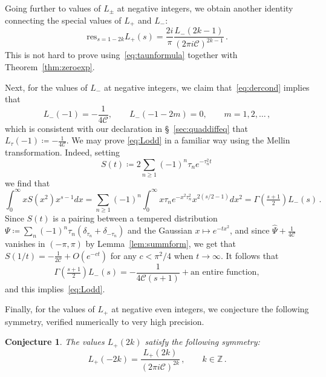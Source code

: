 \documentclass[12pt]{amsart}
\theoremstyle{plain}
\newtheorem{conjecture}{Conjecture}
\numberwithin{equation}{section}
\theoremstyle{definition}
\newcommand{\Z}{\mathbb{Z}}
\newcommand{\Cone}{\mathscr{C}}
\begin{document}
Going further to values of $L_{\pm}$ at negative integers, we obtain another identity connecting the special values of $L_{+}$ and $L_{-}$:
	\[\mathrm{res}_{s=1-2k}   L_{+}(s) = \frac{2i}{\pi}\frac{L_{-}(2k-1)}{(2\pi i \Cone)^{2k-1}}\,.\]
This is not hard to prove using~\eqref{eq:taunformula} together with Theorem~\ref{thm:zeroexp}.

Next, for the values of $L_{-}$ at negative integers, we claim that~\eqref{eq:dercond} implies that
	\begin{equation} \label{eq:Lodd} 
		L_{-}(-1)=-\frac{1}{4\Cone},\qquad L_{-}(-1-2m)=0,\qquad m=1,2,\dots\, ,
	\end{equation}
which is consistent with our declaration in  \S~\ref{sec:quaddiffeq}  that $L_{\tau}(-1)\coloneqq -\frac{1}{4\Cone}$. 
We may prove \eqref{eq:Lodd} in a familiar way using the Mellin transformation.  Indeed, setting
	\[S(t) \coloneqq 2\sum_{n\ge1}(-1)^n\tau_ne^{-\tau_n^2 t}\, \]
we find that 
	\[\int_{0}^{\infty}xS(x^2)x^{s-1}dx = \sum_{n\ge1}(-1)^{n}\int_{0}^{\infty}x\tau_ne^{-x^2\tau_n^2}x^{2(s/2-1)}dx^2
	= \Gamma(\tfrac{s+1}{2})L_{-}(s)\,.\]
Since $S(t)$ is a pairing between a tempered distribution $\Psi\coloneqq \sum_{n}(-1)^n\tau_n(\delta_{\tau_n}+\delta_{-\tau_n})$ and the Gaussian $x\mapsto e^{-t x^2}$, and since $\widehat{\Psi}+\frac{1}{4\Cone}$ vanishes in $(-\pi,\pi)$ by Lemma~\ref{lem:summform}, we get that $S(1/t) = -\frac{1}{2\Cone} + O(e^{-ct})$ for any $c<\pi^2/4$ when $t\to \infty$. It follows that
\[  \Gamma(\tfrac{s+1}{2})L_{-}(s) = - \frac{1}{4\Cone (s+1)} + \text{an entire function}, \]
and this implies~\eqref{eq:Lodd}.

Finally, for the values of $L_{+}$ at negative even integers,  we conjecture the following symmetry, verified numerically to very high precision.
\begin{conjecture}
	The values $L_{+}(2k)$ satisfy the following symmetry:
	\[L_{+}(-2k) = \frac{L_{+}(2k)}{(2\pi i\Cone)^{2k}}\,,\qquad k\in \Z\,.\]
\end{conjecture}
\end{document}
